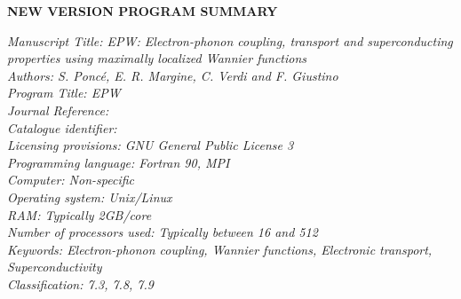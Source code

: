 \documentclass[final,3p,times,twocolumn]{elsarticle}
\newcounter{bla}
\begin{document}


{\bf NEW VERSION PROGRAM SUMMARY}

\begin{small}
\noindent
{\em Manuscript Title: EPW: Electron-phonon coupling, transport and superconducting properties using maximally localized Wannier functions}                                       \\
{\em Authors: S. Ponc\'e, E. R. Margine, C. Verdi and F. Giustino}                         \\
{\em Program Title: EPW}                                          \\
{\em Journal Reference:}                                      \\
{\em Catalogue identifier:}                                   \\
{\em Licensing provisions: GNU General Public License 3}                                   \\
{\em Programming language: Fortran 90, MPI}                          \\
{\em Computer: Non-specific}                                               \\
{\em Operating system: Unix/Linux}                                       \\
{\em RAM: Typically 2GB/core}                                               \\
{\em Number of processors used: Typically between 16 and 512}                              \\
{\em Keywords: Electron-phonon coupling, Wannier functions, Electronic transport, Superconductivity}   \\
{\em Classification: 7.3, 7.8, 7.9}                                         \\

\end{small}
\end{document}
